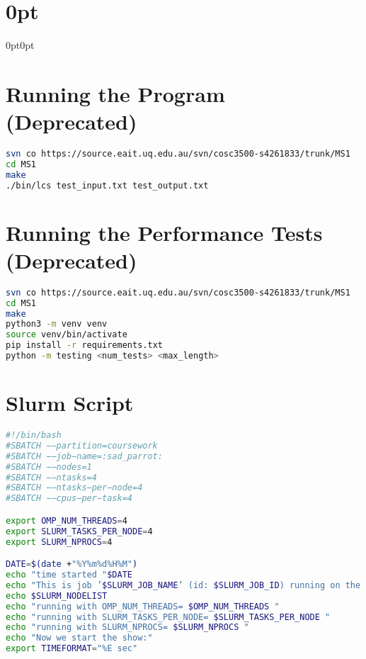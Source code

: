 \titlespacing\chapter{0pt}{0pt}{0pt}
\titleformat{\chapter}[display]{\bfseries}{\huge\appendixname~\thechapter}{2ex}{\LARGE}

\begin{appendices}

\chapter{Running the Program (Deprecated)}

\begin{lstlisting}[language=bash, caption=Usage Instructions, captionpos=b]
svn co https://source.eait.uq.edu.au/svn/cosc3500-s4261833/trunk/MS1
cd MS1
make
./bin/lcs test_input.txt test_output.txt
\end{lstlisting}

\chapter{Running the Performance Tests (Deprecated)}
\begin{lstlisting}[language=bash, caption=Usage Instructions, captionpos=b]
svn co https://source.eait.uq.edu.au/svn/cosc3500-s4261833/trunk/MS1
cd MS1
make
python3 -m venv venv
source venv/bin/activate
pip install -r requirements.txt
python -m testing <num_tests> <max_length>
\end{lstlisting}

\chapter{Slurm Script}
\begin{lstlisting}[language=bash, caption=Slurm Script (go.sh), captionpos=b]
#!/bin/bash
#SBATCH −−partition=coursework
#SBATCH −−job−name=:sad_parrot:
#SBATCH −−nodes=1
#SBATCH −−ntasks=4
#SBATCH −−ntasks−per−node=4
#SBATCH −−cpus−per−task=4

export OMP_NUM_THREADS=4
export SLURM_TASKS_PER_NODE=4
export SLURM_NPROCS=4

DATE=$(date +"%Y%m%d%H%M")
echo "time started "$DATE
echo "This is job ’$SLURM_JOB_NAME’ (id: $SLURM_JOB_ID) running on the following nodes:"
echo $SLURM_NODELIST
echo "running with OMP_NUM_THREADS= $OMP_NUM_THREADS "
echo "running with SLURM_TASKS_PER_NODE= $SLURM_TASKS_PER_NODE "
echo "running with SLURM_NPROCS= $SLURM_NPROCS "
echo "Now we start the show:"
export TIMEFORMAT="%E sec"


\end{lstlisting}
\end{appendices}
